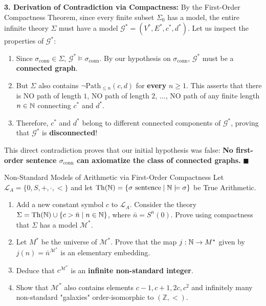 \begin{solution}
\textbf{3. Derivation of Contradiction via Compactness:}
By the First-Order Compactness Theorem, since every finite subset $\Sigma_0$ has a model, the entire infinite theory $\Sigma$ must have a model $\mathcal{G}^* = (V^*, E^*, c^*, d^*)$.
Let us inspect the properties of $\mathcal{G}^*$:
\begin{enumerate}[leftmargin=1.4em,itemsep=2pt]
  \item Since $\sigma_{\mathrm{conn}} \in \Sigma$, $\mathcal{G}^* \models \sigma_{\mathrm{conn}}$. By our hypothesis on $\sigma_{\mathrm{conn}}$, $\mathcal{G}^*$ must be a \textbf{connected graph}.
  \item But $\Sigma$ also contains $\neg \mathrm{Path}_{\le n}(c, d)$ for \textbf{every} $n \ge 1$.
  This asserts that there is NO path of length $1$, NO path of length $2$, $\dots$, NO path of any finite length $n \in \mathbb{N}$ connecting $c^*$ and $d^*$.
  \item Therefore, $c^*$ and $d^*$ belong to different connected components of $\mathcal{G}^*$, proving that $\mathcal{G}^*$ is \textbf{disconnected}!
\end{enumerate}
This direct contradiction proves that our initial hypothesis was false:
\textbf{No first-order sentence $\sigma_{\mathrm{conn}}$ can axiomatize the class of connected graphs.} \hfill $\blacksquare$
\end{solution}

\begin{exercise}{Non-Standard Models of Arithmetic via First-Order Compactness}
Let $\mathcal{L}_A = \{0, S, +, \cdot, <\}$ and let $\mathrm{Th}(\mathbb{N}) = \{ \sigma \text{ sentence} \mid \mathbb{N} \models \sigma \}$ be True Arithmetic.
\begin{enumerate}[leftmargin=1.5em,itemsep=2pt]
  \item Add a new constant symbol $c$ to $\mathcal{L}_A$.
  Consider the theory $\Sigma = \mathrm{Th}(\mathbb{N}) \cup \{ c > \bar{n} \mid n \in \mathbb{N} \}$, where $\bar{n} = S^n(0)$.
  Prove using compactness that $\Sigma$ has a model $\mathcal{M}^*$.
  \item Let $M^*$ be the universe of $\mathcal{M}^*$. Prove that the map $j: \mathbb{N} \to M^*$ given by $j(n) = \bar{n}^{\mathcal{M}^*}$ is an elementary embedding.
  \item Deduce that $c^{\mathcal{M}^*}$ is an \textbf{infinite non-standard integer}.
  \item Show that $\mathcal{M}^*$ also contains elements $c - 1, c + 1, 2c, c^2$ and infinitely many non-standard "galaxies" order-isomorphic to $(\mathbb{Z}, <)$.
\end{enumerate}
\end{exercise}

